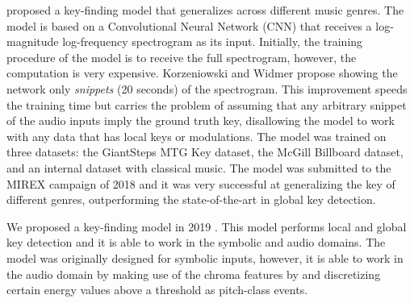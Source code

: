 

\textcite{korzeniowski2018genreagnostic} proposed a
key-finding model that generalizes across different music
genres. The model is based on a Convolutional Neural Network
(CNN) that receives a log-magnitude log-frequency
spectrogram as its input. Initially, the training procedure
of the model is to receive the full spectrogram, however,
the computation is very expensive. Korzeniowski and Widmer
propose showing the network only \emph{snippets} (20
seconds) of the spectrogram. This improvement speeds the
training time but carries the problem of assuming that any
arbitrary snippet of the audio inputs imply the ground truth
key, disallowing the model to work with any data that has
local keys or modulations. The model was trained on three
datasets: the GiantSteps MTG Key dataset, the McGill
Billboard dataset, and an internal dataset with classical
music. The model was submitted to the MIREX campaign of 2018
and it was very successful at generalizing the key of
different genres, outperforming the state-of-the-art in
global key detection.


We proposed a key-finding model in 2019
\parencite{napoleslopez2019keyfinding}. This model performs
local and global key detection and it is able to work in the
symbolic and audio domains. The model was originally
designed for symbolic inputs, however, it is able to work in
the audio domain by making use of the chroma features by
\textcite{mauch2010approximate} and discretizing certain
energy values above a threshold as pitch-class events.

